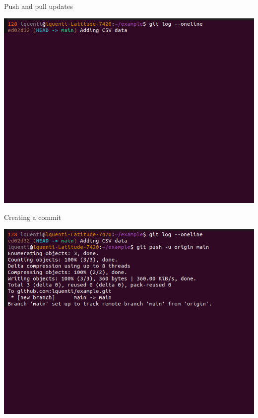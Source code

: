 \documentclass[compress,aspectratio=169]{beamer}
\begin{document}
  \begin{frame}{Push and pull updates}
    \begin{center}
      \includegraphics[height=0.85\textheight]{./assets/terminal_slideshows/03_Push_Pull_01.png}
    \end{center}
  \end{frame}
  \begin{frame}[noframenumbering]{Creating a commit}
    \begin{center}
      \includegraphics[height=0.85\textheight]{./assets/terminal_slideshows/03_Push_Pull_02.png}
    \end{center}
  \end{frame}
\end{document}
